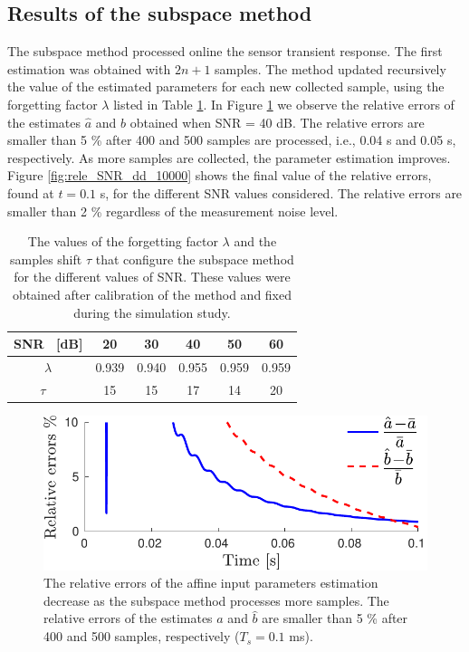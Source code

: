 \subsection{Results of the subspace method}


The subspace method processed online the sensor transient response.
The first estimation was obtained with $2n+1$ samples.
The method updated recursively the value of the estimated parameters for each new collected sample, using the forgetting factor $\lambda$ listed in Table \ref{table:lambdas}.
In Figure \ref{fig:rele_dd_40dB_s1} we observe the relative errors of the estimates $\widehat{a}$ and $\widehat{b}$ obtained when SNR = 40 dB. 
The relative errors are smaller than 5 \% after 400 and 500 samples are processed, i.e., 0.04 s and 0.05 s, respectively.
As more samples are collected, the parameter estimation improves.
Figure \ref{fig:rele_SNR_dd_10000} shows the final value of the relative errors, found at $t=0.1$ s, for the different SNR values considered.
The relative errors are smaller than 2 \% regardless of the measurement noise level.

\begin{table}[h!]
\centering
\caption{The values of the forgetting factor $\lambda$ and the samples shift $\tau$ that configure the subspace method for the different values of SNR. These values were obtained after calibration of the method and fixed during the simulation study.}
\begin{tabular}{c| c c c c c} 
 \hline
 SNR \ [dB] & 20 & 30 & 40 & 50 & 60 \\ [0.5ex] 
 \hline
 $\lambda$ & 0.939 & 0.940 & 0.955 & 0.959 & 0.959 \\ %
 $\tau$ \  & 15 & 15 & 17 & 14 & 20 \\ [0.5ex] %
 \hline
\end{tabular}
\label{table:lambdas}
\end{table}


\begin{figure}[!htbp]
\centering
\includegraphics[width=1\columnwidth]{./ChapterRampInput/fig/Fig_3.pdf} 
\caption{ \label{fig:rele_dd_40dB_s1} The relative errors of the affine input parameters estimation decrease as the subspace method processes more samples. The relative errors of the estimates $\widehat{a}$ and $\widehat{b}$ are smaller than 5 \% after 400 and 500 samples, respectively ($T_s = 0.1$ ms). }
\end{figure}


